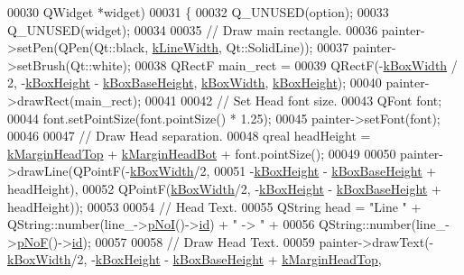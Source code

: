 \begin{DoxyCode}
00030                      QWidget *widget)
00031 \{
00032   Q\_UNUSED(option);
00033   Q\_UNUSED(widget);
00034 
00035   \textcolor{comment}{// Draw main rectangle.}
00036   painter->setPen(QPen(Qt::black, \hyperlink{class_info_line_a18390d54c56cd68cf6e767a5df7404d8}{kLineWidth}, Qt::SolidLine));
00037   painter->setBrush(Qt::white);
00038   QRectF main\_rect =
00039     QRectF(-\hyperlink{class_info_line_af71f2b91ea77398bd770b973b71e2896}{kBoxWidth} / 2, -\hyperlink{class_info_line_a279cafcac8d844a00bd27dde524102dd}{kBoxHeight} - \hyperlink{class_info_line_ab332e0b1c83e5ab8f551e3f39b2dfc55}{kBoxBaseHeight}, 
      \hyperlink{class_info_line_af71f2b91ea77398bd770b973b71e2896}{kBoxWidth}, \hyperlink{class_info_line_a279cafcac8d844a00bd27dde524102dd}{kBoxHeight});
00040   painter->drawRect(main\_rect);
00041 
00042   \textcolor{comment}{// Set Head font size.}
00043   QFont font;
00044   font.setPointSize(font.pointSize() * 1.25);
00045   painter->setFont(font);
00046 
00047   \textcolor{comment}{// Draw Head separation.}
00048   qreal headHeight = \hyperlink{class_info_line_aa08e22c99ce13c2fc57a9d9c9de4d99f}{kMarginHeadTop} + \hyperlink{class_info_line_a3d981c2b5f55052aad8d105177be443d}{kMarginHeadBot} + font.pointSize();
00049 
00050   painter->drawLine(QPointF(-\hyperlink{class_info_line_af71f2b91ea77398bd770b973b71e2896}{kBoxWidth}/2,
00051                             -\hyperlink{class_info_line_a279cafcac8d844a00bd27dde524102dd}{kBoxHeight} - \hyperlink{class_info_line_ab332e0b1c83e5ab8f551e3f39b2dfc55}{kBoxBaseHeight} + headHeight),
00052                     QPointF(\hyperlink{class_info_line_af71f2b91ea77398bd770b973b71e2896}{kBoxWidth}/2, -\hyperlink{class_info_line_a279cafcac8d844a00bd27dde524102dd}{kBoxHeight} - 
      \hyperlink{class_info_line_ab332e0b1c83e5ab8f551e3f39b2dfc55}{kBoxBaseHeight} + headHeight));
00053 
00054   \textcolor{comment}{// Head Text.}
00055   QString head = \textcolor{stringliteral}{"Line "} + QString::number(line\_->\hyperlink{group___models_gaeafd90e84ac2f8de2a879abe9e53eef3}{pNoI}()->\hyperlink{class_bar_a9dc5c6a6d44fe412ae34ef8a881b8dce}{id}) + \textcolor{stringliteral}{" -> "} +
00056                  QString::number(line\_->\hyperlink{group___models_gabbc73ddedd3075c33ae5331bd7c9829f}{pNoF}()->\hyperlink{class_bar_a9dc5c6a6d44fe412ae34ef8a881b8dce}{id});
00057 
00058   \textcolor{comment}{// Draw Head Text.}
00059   painter->drawText(-\hyperlink{class_info_line_af71f2b91ea77398bd770b973b71e2896}{kBoxWidth}/2, -\hyperlink{class_info_line_a279cafcac8d844a00bd27dde524102dd}{kBoxHeight} - 
      \hyperlink{class_info_line_ab332e0b1c83e5ab8f551e3f39b2dfc55}{kBoxBaseHeight} + \hyperlink{class_info_line_aa08e22c99ce13c2fc57a9d9c9de4d99f}{kMarginHeadTop},

\end{DoxyCode}
